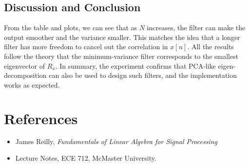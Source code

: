 \documentclass[12pt,a4paper]{article}
\begin{document}
\subsection{Discussion and Conclusion}
From the table and plots, we can see that as $N$ increases, the filter can make the output smoother and the variance smaller.  
This matches the idea that a longer filter has more freedom to cancel out the correlation in $x[n]$.  
All the results follow the theory that the minimum-variance filter corresponds to the smallest eigenvector of $R_x$.  
In summary, the experiment confirms that PCA-like eigen-decomposition can also be used to design such filters, and the implementation works as expected.
\newpage
\section*{References}
\begin{itemize}
    \item James Reilly, \textit{Fundamentals of Linear Algebra for Signal Processing}
    \item Lecture Notes, ECE 712, McMaster University.
\end{itemize}
\end{document}
